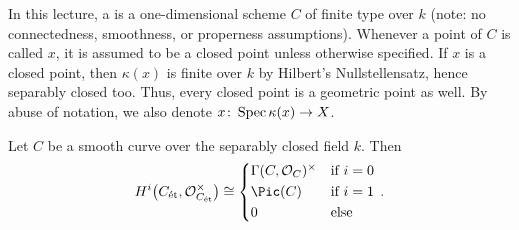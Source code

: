 \label{par:curve}
In this lecture, a  is a one-dimensional scheme $C$ of finite type over $k$ (note: no connectedness, smoothness, or properness assumptions). Whenever a point of $C$ is called $x$, it is assumed to be a closed point unless otherwise specified. If $x$ is a closed point, then $\kappa(x)$ is finite over $k$ by Hilbert's Nullstellensatz, hence separably closed too. Thus, every closed point is a geometric point as well. By abuse of notation, we also denote $x\colon \Spec \kappa(x)\morphism X$.
\begin{prop}\label{prop:CurveCohoOXtimes}
	Let $C$ be a smooth curve over the separably closed field $k$. Then
	\begin{equation*}
		H^i\big(C_\et,\Oo_{C_\et}^\times\big)\cong \begin{cases*}
		\Global(C,\Oo_C)^\times & if $i=0$\\
		\Pic(C) & if $i=1$\\
		0 & else
		\end{cases*}\,.
	\end{equation*}
\end{prop}
